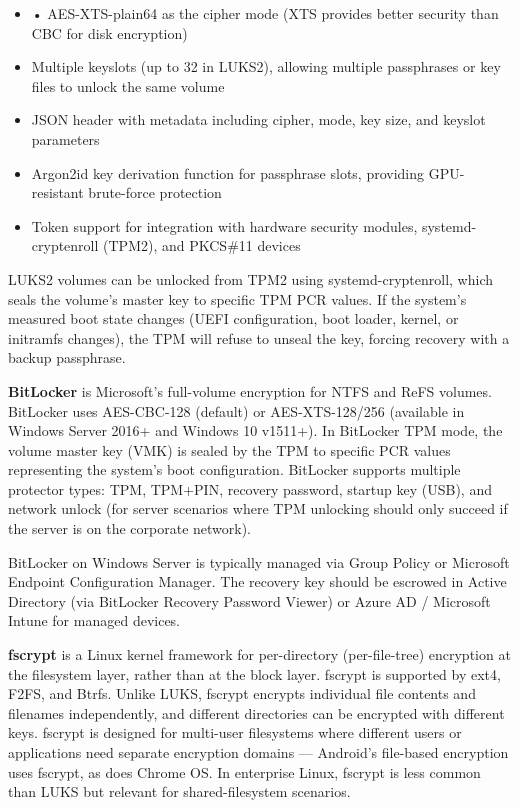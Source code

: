 \begin{itemize}
  \item • AES-XTS-plain64 as the cipher mode (XTS provides better security than CBC for disk encryption)
  \item Multiple keyslots (up to 32 in LUKS2), allowing multiple passphrases or key files to unlock the same volume
  \item JSON header with metadata including cipher, mode, key size, and keyslot parameters
  \item Argon2id key derivation function for passphrase slots, providing GPU-resistant brute-force protection
  \item Token support for integration with hardware security modules, systemd-cryptenroll (TPM2), and PKCS\#11 devices
\end{itemize}

LUKS2 volumes can be unlocked from TPM2 using systemd-cryptenroll, which seals the volume's master key to specific TPM PCR values. If the system's measured boot state changes (UEFI configuration, boot loader, kernel, or initramfs changes), the TPM will refuse to unseal the key, forcing recovery with a backup passphrase.

\textbf{BitLocker} is Microsoft's full-volume encryption for NTFS and ReFS volumes. BitLocker uses AES-CBC-128 (default) or AES-XTS-128/256 (available in Windows Server 2016+ and Windows 10 v1511+). In BitLocker TPM mode, the volume master key (VMK) is sealed by the TPM to specific PCR values representing the system's boot configuration. BitLocker supports multiple protector types: TPM, TPM+PIN, recovery password, startup key (USB), and network unlock (for server scenarios where TPM unlocking should only succeed if the server is on the corporate network).

BitLocker on Windows Server is typically managed via Group Policy or Microsoft Endpoint Configuration Manager. The recovery key should be escrowed in Active Directory (via BitLocker Recovery Password Viewer) or Azure AD / Microsoft Intune for managed devices.

\textbf{fscrypt} is a Linux kernel framework for per-directory (per-file-tree) encryption at the filesystem layer, rather than at the block layer. fscrypt is supported by ext4, F2FS, and Btrfs. Unlike LUKS, fscrypt encrypts individual file contents and filenames independently, and different directories can be encrypted with different keys. fscrypt is designed for multi-user filesystems where different users or applications need separate encryption domains --- Android's file-based encryption uses fscrypt, as does Chrome OS. In enterprise Linux, fscrypt is less common than LUKS but relevant for shared-filesystem scenarios.

